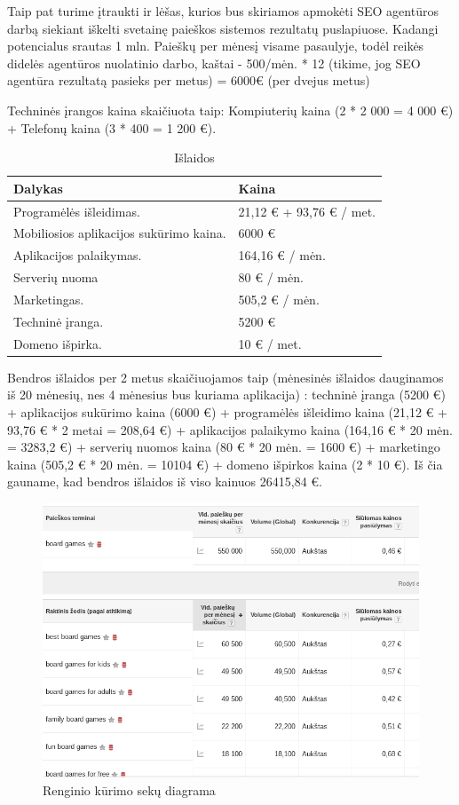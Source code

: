 \documentclass{VUMIFPSkursinis}
\begin{document}
		Taip pat turime įtraukti ir lėšas, kurios bus skiriamos apmokėti SEO 
		agentūros darbą siekiant iškelti svetainę paieškos sistemos rezultatų 
		puslapiuose. Kadangi potencialus srautas 1 mln. Paieškų per mėnesį visame 
		pasaulyje, todėl reikės didelės agentūros nuolatinio darbo, kaštai - 
		500/mėn. * 12 (tikime, jog SEO agentūra rezultatą pasieks per metus) = 
		6000€ (per dvejus metus)

		Techninės įrangos kaina skaičiuota taip: Kompiuterių kaina (2 * 2 000 = 
		4 000 €) + Telefonų kaina (3 * 400 = 1 200 €).
		
		\begin{longtable}{ | m{8cm} | m{8cm} | }
		\caption{Išlaidos}
		\label{variability_impl_mech}
		\endhead
		 \hline			

		\textbf{Dalykas} & \textbf{Kaina} \tabularnewline \hline
		Programėlės išleidimas. & 21,12 € + 93,76 € / met. \tabularnewline \hline
		Mobiliosios aplikacijos sukūrimo kaina. & 6000 € \tabularnewline \hline
		Aplikacijos palaikymas. & 164,16 € / mėn. \tabularnewline \hline
		Serverių nuoma & 80 € / mėn. \tabularnewline \hline
		Marketingas. & 505,2 € / mėn. \tabularnewline \hline
		Techninė įranga. & 5200 €  \tabularnewline \hline
		Domeno išpirka. & 10 € / met. \tabularnewline \hline
		\end{longtable}
		
		Bendros išlaidos per 2 metus skaičiuojamos taip (mėnesinės išlaidos 
		dauginamos iš 20 mėnesių, nes 4 mėnesius bus kuriama aplikacija) : 
		techninė įranga (5200 €) + aplikacijos sukūrimo kaina (6000 €) +  
		programėlės išleidimo kaina (21,12 € + 93,76 € * 2 metai = 208,64 €) + 
		aplikacijos palaikymo kaina (164,16 € * 20 mėn. = 3283,2 €) +  serverių 
		nuomos kaina (80 € * 20 mėn. = 1600 €) + marketingo kaina (505,2 € * 20 
		mėn. = 10104 €) + domeno išpirkos kaina (2 * 10 €). Iš čia gauname, kad 
		bendros išlaidos iš viso kainuos 26415,84 €.
		
		\begin{figure}[H]
			\centering
			\includegraphics[scale=0.5]{img/economics}
			\caption{Renginio kūrimo sekų diagrama}
			\label{img:economics}
		\end{figure}
		
\end{document}
